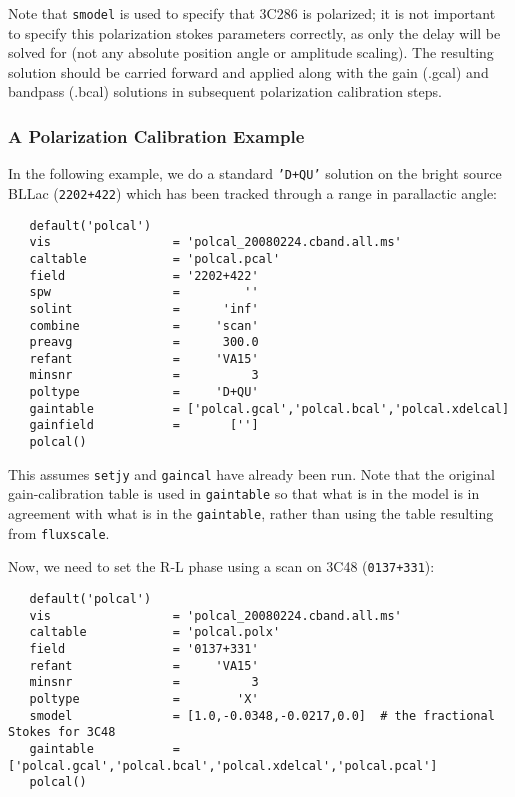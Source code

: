 {Note that {\tt smodel} is used to specify that 3C286 is polarized; it is not
important to specify this polarization stokes parameters correctly, as only 
the delay will be solved for (not any absolute position angle or amplitude 
scaling).  The resulting solution should be carried forward and applied 
along with the gain (.gcal) and
bandpass (.bcal) solutions in subsequent polarization calibration steps.


\subsubsection{A Polarization Calibration Example}
\label{section:cal.solve.pol.example}

In the following example, we do a standard {\tt 'D+QU'} solution on
the bright source BLLac ({\tt 2202+422}) which has been tracked
through a range in parallactic angle:
\small
\begin{verbatim}
   default('polcal')
   vis                 = 'polcal_20080224.cband.all.ms'
   caltable            = 'polcal.pcal'
   field               = '2202+422'        
   spw                 =         ''        
   solint              =      'inf'    
   combine             =     'scan' 
   preavg              =      300.0        
   refant              =     'VA15'        
   minsnr              =          3        
   poltype             =     'D+QU'        
   gaintable           = ['polcal.gcal','polcal.bcal','polcal.xdelcal]
   gainfield           =       ['']
   polcal()
\end{verbatim}
\normalsize This assumes {\tt setjy} and {\tt gaincal} have already
been run.  Note that the original gain-calibration table is used in
{\tt gaintable} so that what is in the model is in agreement with what
is in the {\tt gaintable}, rather than using the table resulting from
{\tt fluxscale}.

Now, we need to set the R-L phase using a scan on
3C48 ({\tt 0137+331}):
\small
\begin{verbatim}
   default('polcal')
   vis                 = 'polcal_20080224.cband.all.ms'
   caltable            = 'polcal.polx'
   field               = '0137+331'
   refant              =     'VA15'        
   minsnr              =          3        
   poltype             =        'X'
   smodel              = [1.0,-0.0348,-0.0217,0.0]  # the fractional Stokes for 3C48
   gaintable           = ['polcal.gcal','polcal.bcal','polcal.xdelcal','polcal.pcal']
   polcal()
\end{verbatim}
\normalsize

}
